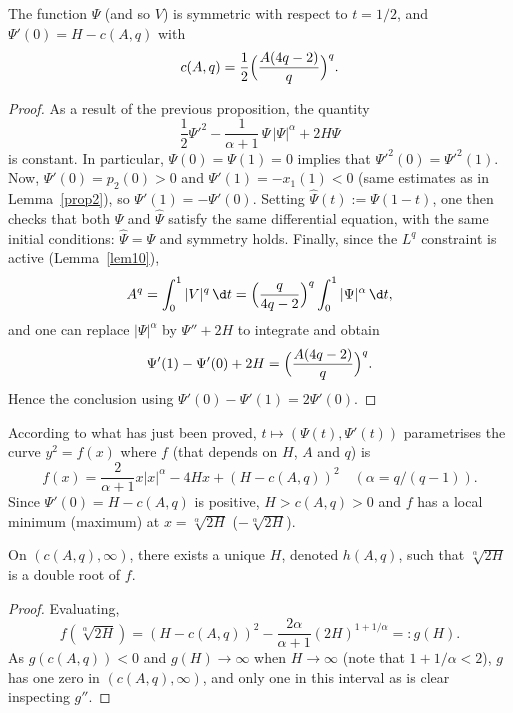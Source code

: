 \begin{cor} \label{cor13}
The function $\Psi$ (and so $V$) is symmetric with respect to $t=1/2$, and
$\Psi'(0)=H-c(A,q)$ with
\[
c(A,q) = \frac{1}{2} \Bigl(\frac{A(4q-2)}{q} \Bigr)^q.
\]
\end{cor}
\begin{proof}
As a result of the previous proposition, the quantity
\[
\frac{1}{2}\Psi'^2-\frac{1}{\alpha+1}\,\Psi\,|\Psi|^\alpha+2H\Psi
\]
is constant. In particular, $\Psi(0)=\Psi(1)=0$ implies that $\Psi'^2(0)=\Psi'^2(1)$.
Now, $\Psi'(0)=p_2(0)>0$ and $\Psi'(1)=-x_1(1)<0$ (same estimates as in
Lemma~\ref{prop2}), so $\Psi'(1)=-\Psi'(0)$. Setting
$\hat{\Psi}(t):=\Psi(1-t)$, one then checks that both $\Psi$ and $\hat{\Psi}$ satisfy
the same differential equation, with the same initial conditions: $\hat{\Psi}=\Psi$
and symmetry holds.
Finally, since the $L^q$ constraint is
active (Lemma~\ref{lem10}),
\[
A^q = \int_0^1 |V|^q\,\d t
= \Bigl(\frac{q}{4q-2} \Bigr)^q \int_0^1 |\Psi|^\alpha\,\d t,
\]
and one can replace $|\Psi|^\alpha$ by $\Psi''+2H$ to integrate and obtain
\[
\Psi'(1)-\Psi'(0)+2H = \Bigl(\frac{A(4q-2)}{q} \Bigr)^q.
\]
Hence the conclusion using $\Psi'(0)-\Psi'(1)=2\Psi'(0)$.
\end{proof}

According to what has just been proved, $t \mapsto (\Psi(t),\Psi'(t))$
parametrises the curve $y^2=f(x)$ where $f$ (that depends on $H$, $A$ and $q$) is
\begin{equation} \label{eq61}
f(x) = \frac{2}{\alpha+1}x|x|^\alpha-4Hx+(H-c(A,q))^2 \quad (\alpha=q/(q-1)).
\end{equation}
Since $\Psi'(0)=H-c(A,q)$ is positive, $H > c(A,q) > 0$ and $f$ has a local minimum
(\resp maximum) at $x=\sqrt[\alpha]{2H}$ (\resp $-\sqrt[\alpha]{2H}$).

\begin{lemma} \label{lem12}
On $(c(A,q),\infty)$, there exists a unique $H$, denoted $h(A,q)$,
such that $\sqrt[\alpha]{2H}$ is a double root of $f$.
\end{lemma}
\begin{proof}
Evaluating,
\[
f(\sqrt[\alpha]{2H}) = (H-c(A,q))^2-\frac{2\alpha}{\alpha+1}(2H)^{1+1/\alpha}
=: g(H).
\]
As $g(c(A,q))<0$ and $g(H) \to \infty$ when $H \to \infty$ (note that $1+1/\alpha<2$),
$g$ has one zero in $(c(A,q),\infty)$, and only one in this interval as is clear
inspecting $g''$.
\end{proof}


